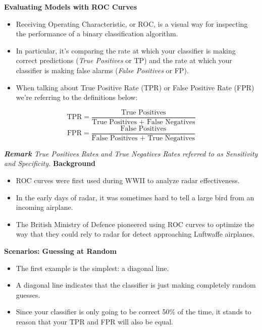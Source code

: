 \documentclass[SKL-MASTER.tex]{subfiles}
\begin{document}
\LARGE
\noindent\textbf{Evaluating Models with ROC Curves}
\begin{itemize}
\item Receiving Operating Characteristic, or ROC, is a visual way for inspecting the performance of a binary classification algorithm. 
\item In particular, it's comparing the rate at which your classifier is making correct predictions (\textit{True Positives} or TP) and the rate at which your classifier is making false alarms (\textit{False Positives} or FP). 
\item When talking about True Positive Rate (TPR) or False Positive Rate (FPR) we're referring to the definitions below:
\end{itemize}

\[ \mbox{TPR}= \frac{\mbox{True Positives}}{\mbox{True Positives + False Negatives} } \]
\[ \mbox{FPR}=\frac{\mbox{False Positives}}{\mbox{False Positives + True Negatives} }\]

\noindent \textit{\textbf{Remark} True Positives Rates and True Negatives Rates referred to as Sensitivity and Specificity.}
\newpage
\noindent\textbf{Background } \\
\begin{itemize}
\item ROC curves were first used during WWII to analyze radar effectiveness. 
\item In the early days of radar, it was sometimes hard to tell a large bird from an incoming airplane. 
\item The British Ministry of Defence pioneered using ROC curves to optimize the way that they could rely to radar for detect approaching Luftwaffe airplanes.
\end{itemize}



\newpage
\noindent \textbf{Scenarios: Guessing at Random}
\begin{itemize}
\item The first example is the simplest: a diagonal line. 
\item A diagonal line indicates that the classifier is just making completely random guesses.
\item Since your classifier is only going to be correct 50\% of the time, it stands to reason that your TPR and FPR will also be equal.
\end{itemize}
\end{document}
